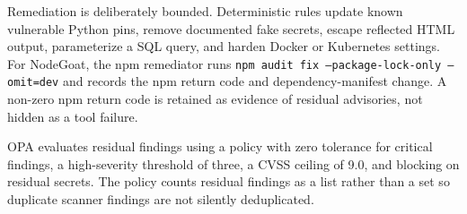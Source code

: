 Remediation is deliberately bounded. Deterministic rules update known vulnerable Python pins, remove documented fake secrets, escape reflected HTML output, parameterize a SQL query, and harden Docker or Kubernetes settings. For NodeGoat, the npm remediator runs \texttt{npm audit fix --package-lock-only --omit=dev} and records the npm return code and dependency-manifest change. A non-zero npm return code is retained as evidence of residual advisories, not hidden as a tool failure.

OPA evaluates residual findings using a policy with zero tolerance for critical findings, a high-severity threshold of three, a CVSS ceiling of 9.0, and blocking on residual secrets. The policy counts residual findings as a list rather than a set so duplicate scanner findings are not silently deduplicated.
